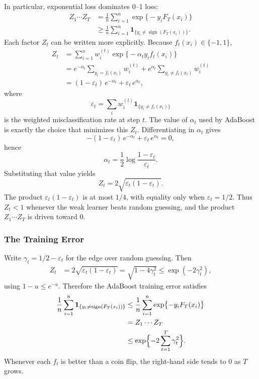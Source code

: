 \documentclass[
]{book}
\begin{document}
In particular, exponential loss dominates 0--1 loss:
\begin{align*}
Z_1 \cdots Z_T
&=
\frac{1}{n} \sum_{i=1}^{n} \exp\bigl\{-y_i F_T(x_i)\bigr\} \\
&\ge
\frac{1}{n} \sum_{i=1}^{n} \mathbf{1}_{\{y_i \neq \operatorname{sign}(F_T(x_i))\}}.
\end{align*}
Each factor \(Z_t\) can be written more explicitly. Because \(f_t(x_i)\in\{-1,1\}\),
\begin{align*}
Z_t
&=
\sum_{i=1}^{n} w_i^{(t)} \exp\bigl\{-\alpha_t y_i f_t(x_i)\bigr\} \\
&=
e^{-\alpha_t} \sum_{y_i = f_t(x_i)} w_i^{(t)}
+
e^{\alpha_t} \sum_{y_i \neq f_t(x_i)} w_i^{(t)} \\
&=
(1-\varepsilon_t)\, e^{-\alpha_t} + \varepsilon_t\, e^{\alpha_t},
\end{align*}
where
\[
\varepsilon_t = \sum_i w_i^{(t)} \mathbf{1}_{\{y_i \neq f_t(x_i)\}}
\]
is the weighted misclassification rate at step \(t\). The value of \(\alpha_t\) used by AdaBoost is exactly the choice that minimizes this \(Z_t\). Differentiating in \(\alpha_t\) gives
\[
-(1-\varepsilon_t)\, e^{-\alpha_t} + \varepsilon_t\, e^{\alpha_t} = 0,
\]
hence
\[
\alpha_t = \frac12 \log \frac{1-\varepsilon_t}{\varepsilon_t}.
\]
Substituting that value yields
\[
Z_t = 2\sqrt{\varepsilon_t(1-\varepsilon_t)}.
\]
The product \(\varepsilon_t(1-\varepsilon_t)\) is at most \(1/4\), with equality only when \(\varepsilon_t = 1/2\). Thus \(Z_t < 1\) whenever the weak learner beats random guessing, and the product \(Z_1 \cdots Z_T\) is driven toward 0.

\subsubsection*{The Training Error}\label{the-training-error}

Write \(\gamma_t = 1/2 - \varepsilon_t\) for the edge over random guessing. Then
\begin{align*}
Z_t
&=
2\sqrt{\varepsilon_t(1-\varepsilon_t)}
=
\sqrt{1-4\gamma_t^2}
\le
\exp(-2\gamma_t^2),
\end{align*}
using \(1-u \le e^{-u}\). Therefore the AdaBoost training error satisfies
\begin{align*}
\frac{1}{n}\sum_{i=1}^{n} \mathbf{1}_{\{y_i \neq \operatorname{sign}(F_T(x_i))\}}
&\le
\frac{1}{n}\sum_{i=1}^{n} \exp\bigl\{-y_i F_T(x_i)\bigr\} \\
&=
Z_1 \cdots Z_T \\
&\le
\exp\Bigl\{-2\sum_{t=1}^{T}\gamma_t^2\Bigr\}.
\end{align*}
Whenever each \(f_t\) is better than a coin flip, the right-hand side tends to 0 as \(T\) grows.
\end{document}
